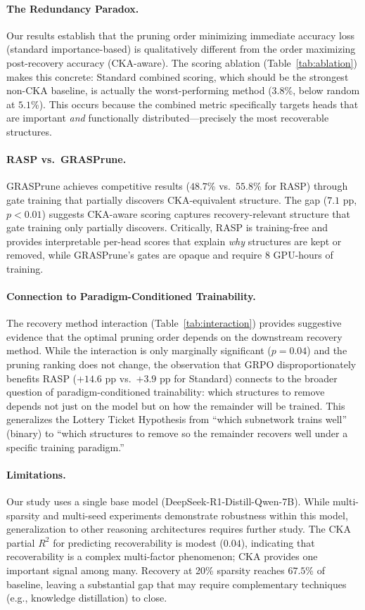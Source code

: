 \documentclass[11pt,a4paper]{article}
\begin{document}
\paragraph{The Redundancy Paradox.}
Our results establish that the pruning order minimizing immediate accuracy loss (standard importance-based) is qualitatively different from the order maximizing post-recovery accuracy (CKA-aware). The scoring ablation (Table~\ref{tab:ablation}) makes this concrete: Standard combined scoring, which should be the strongest non-CKA baseline, is actually the worst-performing method ($3.8$\%, below random at $5.1$\%). This occurs because the combined metric specifically targets heads that are important \emph{and} functionally distributed---precisely the most recoverable structures.

\paragraph{RASP vs.\ GRASPrune.}
GRASPrune achieves competitive results ($48.7$\% vs.\ $55.8$\% for RASP) through gate training that partially discovers CKA-equivalent structure. The gap ($7.1$ pp, $p < 0.01$) suggests CKA-aware scoring captures recovery-relevant structure that gate training only partially discovers. Critically, RASP is training-free and provides interpretable per-head scores that explain \emph{why} structures are kept or removed, while GRASPrune's gates are opaque and require 8 GPU-hours of training.

\paragraph{Connection to Paradigm-Conditioned Trainability.}
The recovery method interaction (Table~\ref{tab:interaction}) provides suggestive evidence that the optimal pruning order depends on the downstream recovery method. While the interaction is only marginally significant ($p = 0.04$) and the pruning ranking does not change, the observation that GRPO disproportionately benefits RASP ($+14.6$ pp vs.\ $+3.9$ pp for Standard) connects to the broader question of paradigm-conditioned trainability: which structures to remove depends not just on the model but on how the remainder will be trained. This generalizes the Lottery Ticket Hypothesis from ``which subnetwork trains well'' (binary) to ``which structures to remove so the remainder recovers well under a specific training paradigm.''

\paragraph{Limitations.}
Our study uses a single base model (DeepSeek-R1-Distill-Qwen-7B). While multi-sparsity and multi-seed experiments demonstrate robustness within this model, generalization to other reasoning architectures requires further study. The CKA partial $R^2$ for predicting recoverability is modest ($0.04$), indicating that recoverability is a complex multi-factor phenomenon; CKA provides one important signal among many. Recovery at 20\% sparsity reaches $67.5$\% of baseline, leaving a substantial gap that may require complementary techniques (e.g., knowledge distillation) to close.
\end{document}
